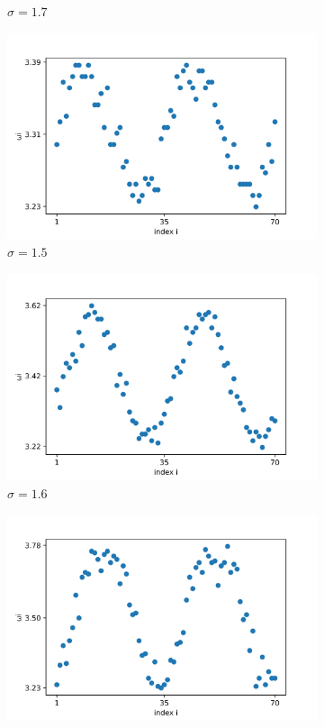 \documentclass[a4paper,12pt]{article}
\begin{document}
\begin{figure}[H]
\begin{subfigure}{.32\textwidth}
  \caption{$\sigma = 1.7$}
\end{subfigure}
\begin{subfigure}{.32\textwidth}
  \centering
  \includegraphics[width=1\linewidth]{w_sigma=1.5.png}  
  \caption{$\sigma = 1.5$}
\end{subfigure}
\hfill
\begin{subfigure}{.32\textwidth}
  \centering
  \includegraphics[width=1\linewidth]{w_sigma=1.6.png}  
  \caption{$\sigma = 1.6$}
\end{subfigure}
\hfill
\begin{subfigure}{.32\textwidth}
  \centering
  \includegraphics[width=1\linewidth]{w_sigma=1.7.png}  

\end{subfigure}
\end{figure}
\end{document}
